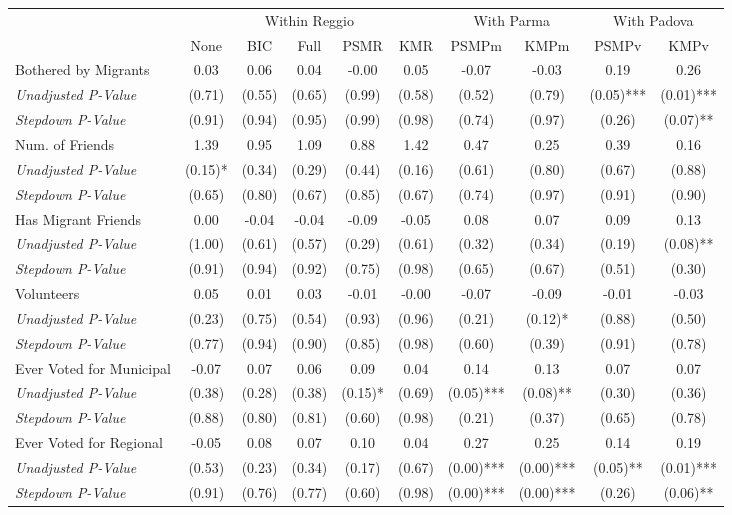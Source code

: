 \begin{tabular}{l c c c c c c c c c}
\toprule
& \multicolumn{5}{c}{Within Reggio} & \multicolumn{2}{c}{With Parma} & \multicolumn{2}{c}{With Padova} \\\cmidrule(lr){2-6} \cmidrule(lr){7-8} \cmidrule(lr){9-10}
 & None & BIC & Full & PSMR & KMR & PSMPm & KMPm & PSMPv & KMPv \\
\midrule
Bothered by Migrants & 0.03 & 0.06 & 0.04 & -0.00 & 0.05 & -0.07 & -0.03 & 0.19 & 0.26 \\
\quad \textit{Unadjusted P-Value} & (0.71) & (0.55) & (0.65) & (0.99) & (0.58) & (0.52) & (0.79) & (0.05)*** & (0.01)*** \\
\quad \textit{Stepdown P-Value} & (0.91) & (0.94) & (0.95) & (0.99) & (0.98) & (0.74) & (0.97) & (0.26) & (0.07)** \\
Num. of Friends & 1.39 & 0.95 & 1.09 & 0.88 & 1.42 & 0.47 & 0.25 & 0.39 & 0.16 \\
\quad \textit{Unadjusted P-Value} & (0.15)* & (0.34) & (0.29) & (0.44) & (0.16) & (0.61) & (0.80) & (0.67) & (0.88) \\
\quad \textit{Stepdown P-Value} & (0.65) & (0.80) & (0.67) & (0.85) & (0.67) & (0.74) & (0.97) & (0.91) & (0.90) \\
Has Migrant Friends & 0.00 & -0.04 & -0.04 & -0.09 & -0.05 & 0.08 & 0.07 & 0.09 & 0.13 \\
\quad \textit{Unadjusted P-Value} & (1.00) & (0.61) & (0.57) & (0.29) & (0.61) & (0.32) & (0.34) & (0.19) & (0.08)** \\
\quad \textit{Stepdown P-Value} & (0.91) & (0.94) & (0.92) & (0.75) & (0.98) & (0.65) & (0.67) & (0.51) & (0.30) \\
Volunteers & 0.05 & 0.01 & 0.03 & -0.01 & -0.00 & -0.07 & -0.09 & -0.01 & -0.03 \\
\quad \textit{Unadjusted P-Value} & (0.23) & (0.75) & (0.54) & (0.93) & (0.96) & (0.21) & (0.12)* & (0.88) & (0.50) \\
\quad \textit{Stepdown P-Value} & (0.77) & (0.94) & (0.90) & (0.85) & (0.98) & (0.60) & (0.39) & (0.91) & (0.78) \\
Ever Voted for Municipal & -0.07 & 0.07 & 0.06 & 0.09 & 0.04 & 0.14 & 0.13 & 0.07 & 0.07 \\
\quad \textit{Unadjusted P-Value} & (0.38) & (0.28) & (0.38) & (0.15)* & (0.69) & (0.05)*** & (0.08)** & (0.30) & (0.36) \\
\quad \textit{Stepdown P-Value} & (0.88) & (0.80) & (0.81) & (0.60) & (0.98) & (0.21) & (0.37) & (0.65) & (0.78) \\
Ever Voted for Regional & -0.05 & 0.08 & 0.07 & 0.10 & 0.04 & 0.27 & 0.25 & 0.14 & 0.19 \\
\quad \textit{Unadjusted P-Value} & (0.53) & (0.23) & (0.34) & (0.17) & (0.67) & (0.00)*** & (0.00)*** & (0.05)** & (0.01)*** \\
\quad \textit{Stepdown P-Value} & (0.91) & (0.76) & (0.77) & (0.60) & (0.98) & (0.00)*** & (0.00)*** & (0.26) & (0.06)** \\
\bottomrule
\end{tabular}
